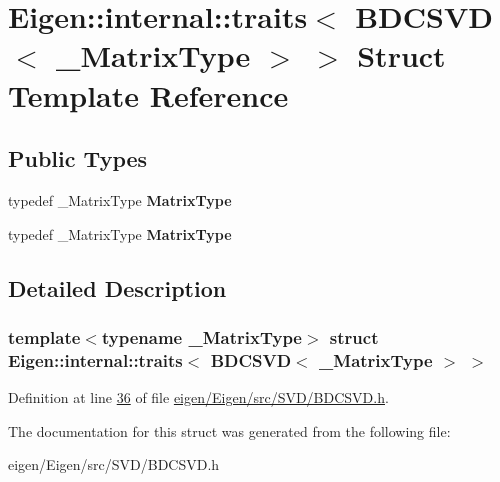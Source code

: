 \hypertarget{struct_eigen_1_1internal_1_1traits_3_01_b_d_c_s_v_d_3_01___matrix_type_01_4_01_4}{}\section{Eigen\+:\+:internal\+:\+:traits$<$ B\+D\+C\+S\+VD$<$ \+\_\+\+Matrix\+Type $>$ $>$ Struct Template Reference}
\label{struct_eigen_1_1internal_1_1traits_3_01_b_d_c_s_v_d_3_01___matrix_type_01_4_01_4}
\subsection*{Public Types}
\begin{DoxyCompactItemize}
\item 
\mbox{\label{struct_eigen_1_1internal_1_1traits_3_01_b_d_c_s_v_d_3_01___matrix_type_01_4_01_4_afd85342058bafd2b0fd201db71b54f50}} 
typedef \+\_\+\+Matrix\+Type {\bfseries Matrix\+Type}
\item 
\mbox{\label{struct_eigen_1_1internal_1_1traits_3_01_b_d_c_s_v_d_3_01___matrix_type_01_4_01_4_afd85342058bafd2b0fd201db71b54f50}} 
typedef \+\_\+\+Matrix\+Type {\bfseries Matrix\+Type}
\end{DoxyCompactItemize}


\subsection{Detailed Description}
\subsubsection*{template$<$typename \+\_\+\+Matrix\+Type$>$\newline
struct Eigen\+::internal\+::traits$<$ B\+D\+C\+S\+V\+D$<$ \+\_\+\+Matrix\+Type $>$ $>$}



Definition at line \hyperlink{eigen_2_eigen_2src_2_s_v_d_2_b_d_c_s_v_d_8h_source_l00036}{36} of file \hyperlink{eigen_2_eigen_2src_2_s_v_d_2_b_d_c_s_v_d_8h_source}{eigen/\+Eigen/src/\+S\+V\+D/\+B\+D\+C\+S\+V\+D.\+h}.



The documentation for this struct was generated from the following file\+:\begin{DoxyCompactItemize}
\item 
eigen/\+Eigen/src/\+S\+V\+D/\+B\+D\+C\+S\+V\+D.\+h\end{DoxyCompactItemize}

